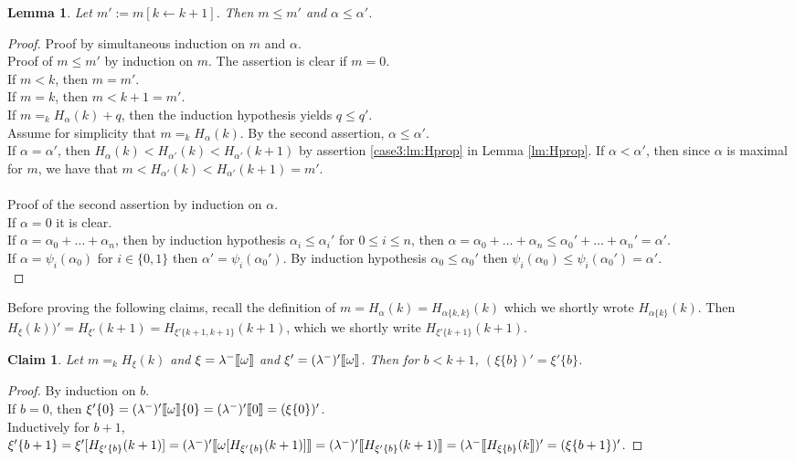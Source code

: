\documentclass{amsart}
\theoremstyle{plain}
\theoremstyle{plain}
\newtheorem{lemma}[theorem]{Lemma}
\newtheorem{claim}[theorem]{Claim}
\def\scbrl{[\hspace{-.14em}[}
\def\scbrr{]\hspace{-.14em}]}
\def\scbr#1{\scbrl#1\scbrr}
\newcommand{\kp}{[k\leftarrow k+1]}
\newcommand{\al}{{\alpha}}
\newcommand{\la}{\lambda}
\newcommand{\om}{\omega}
\def\scbrl{[\hspace{-.14em}[}
\def\scbrr{]\hspace{-.14em}]}
\def\scbr#1{\scbrl#1\scbrr}
\begin{document}
\begin{lemma} \label{lm:basechangeDiff}Let $m' :=m\kp$. Then 
$m \leq m'$ and $\al \leq \al'$.
\end{lemma}
\begin{proof} Proof by simultaneous induction on $m$ and $\al$.\\
Proof of $m \leq m'$ by induction on $m$.
The assertion is clear if $m=0$.\\
If $m<k$, then $m=m'$. \\
If $m=k$, then $m < k+1 =m'$.\\
If $m=_k H_\al(k) +q$, then the induction hypothesis yields $q\leq q'$.\\
Assume for simplicity that $m=_k H_\al(k)$. By the second assertion, $\al\leq \al'$.
\medskip\\
If $\al=\al'$,
then $H_{\al}(k)< H_{\al'}(k) < H_{\al'}(k+1)$ by assertion \ref{case3:lm:Hprop} in Lemma \ref{lm:Hprop}.
If $\al <\al'$, then since $\al$ is maximal for $m$, we have that 
$m<H_{\al'}(k) < H_{\al'}(k+1) =m'.$
\\
\\
Proof of the second assertion by induction on $\al$.\\
If $\al=0$ it is clear.
\\
If $\al=\al_0+ \ldots +\al_n$, then by induction hypothesis $\al_i\leq\al_i'$ for $0 \leq i \leq n$, then $\al=\al_0 + \ldots +\al_n \leq \al_0'+ \ldots +\al_n' =\al'$.
\\
If $\al=\psi_i(\al_0)$  for $i \in \{0,1\}$ then $\al'=\psi_i(\al_0')$. By induction hypothesis $\al_0\leq \al_0'$ then $\psi_i(\al_0)\leq \psi_i(\al_0')=\al'$.\\
\end{proof}



Before proving the following claims, recall the definition of $m=H_\al(k) = H_{\al\{k,k\}}(k)$ which we shortly wrote $H_{\al\{k\}}(k)$.
Then $H_\xi(k))' = H_{\xi'}(k+1) = H_{\xi'\{k+1,k+1\}}(k+1)$, which we shortly write $H_{\xi'\{k+1\}}(k+1)$.
\\
\begin{claim} \label{claim1}
Let $m =_k H_\xi(k)$ and ${\xi}=\la^-\scbr{\om}$ and $\xi' = (\la^-)'\scbr{\om}$.
Then for $b<k+1$, $ (\xi\{b\})'={\xi}'\{b\}$.
\end{claim}		
\begin{proof}
By induction on $b$. \\
If $b=0$, then ${\xi}'\{0\} = (\la^-)'\scbr{\om}\{0\}= (\la^-)'\scbr{0}= (\xi\{0\})'$.\\
Inductively for $b+1$, \\
${\xi'\{b+1\}} =\xi'[H_{\xi'\{b\}}(k+1)] =  (\la^-)'\scbr{\om[H_{\xi'\{b\}}(k+1)]} =
(\la^-)'\scbr{ H_{\xi'\{b\}}(k+1)}  =  (\la^-\scbr{ H_{\xi\{b\}}(k})' =(\xi\{b+1\})'$.
\end{proof} 
\end{document}
